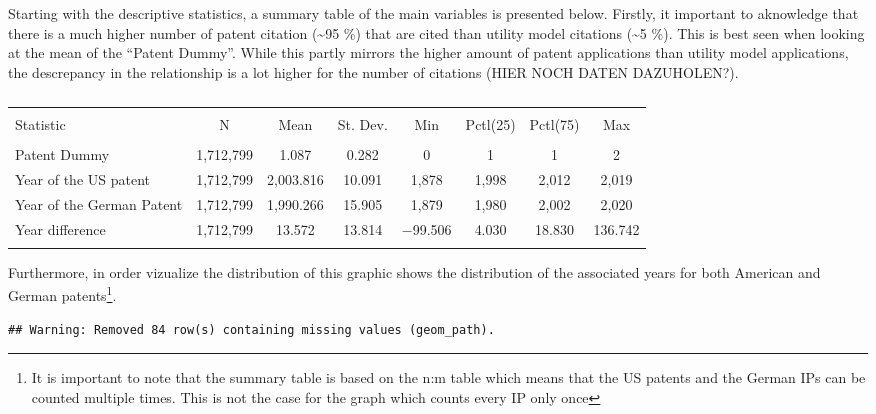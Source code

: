 \documentclass[
  12pt,
]{article}
\begin{document}
Starting with the descriptive statistics, a summary table of the main
variables is presented below. Firstly, it important to aknowledge that
there is a much higher number of patent citation (\textasciitilde95 \%)
that are cited than utility model citations (\textasciitilde5 \%). This
is best seen when looking at the mean of the ``Patent Dummy''. While
this partly mirrors the higher amount of patent applications than
utility model applications, the descrepancy in the relationship is a lot
higher for the number of citations (HIER NOCH DATEN DAZUHOLEN?).

\begin{table}[!htbp] \centering 
  \caption{} 
  \label{} 
\small 
\begin{tabular}{@{\extracolsep{5pt}}lccccccc} 
\\[-1.8ex]\hline 
\hline \\[-1.8ex] 
Statistic & \multicolumn{1}{c}{N} & \multicolumn{1}{c}{Mean} & \multicolumn{1}{c}{St. Dev.} & \multicolumn{1}{c}{Min} & \multicolumn{1}{c}{Pctl(25)} & \multicolumn{1}{c}{Pctl(75)} & \multicolumn{1}{c}{Max} \\ 
\hline \\[-1.8ex] 
Patent Dummy & 1,712,799 & 1.087 & 0.282 & 0 & 1 & 1 & 2 \\ 
Year of the US patent & 1,712,799 & 2,003.816 & 10.091 & 1,878 & 1,998 & 2,012 & 2,019 \\ 
Year of the German Patent & 1,712,799 & 1,990.266 & 15.905 & 1,879 & 1,980 & 2,002 & 2,020 \\ 
Year difference & 1,712,799 & 13.572 & 13.814 & $-$99.506 & 4.030 & 18.830 & 136.742 \\ 
\hline \\[-1.8ex] 
\end{tabular} 
\end{table}

Furthermore, in order vizualize the distribution of this graphic shows
the distribution of the associated years for both American and German
patents\footnote{It is important to note that the summary table is based
  on the n:m table which means that the US patents and the German IPs
  can be counted multiple times. This is not the case for the graph
  which counts every IP only once}.

\begin{verbatim}
## Warning: Removed 84 row(s) containing missing values (geom_path).
\end{verbatim}
\end{document}
